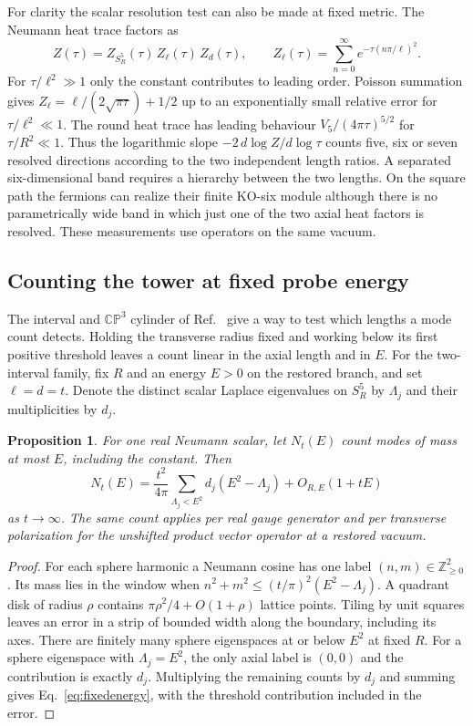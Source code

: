 \documentclass[aps,prd,reprint,onecolumn,nofootinbib,amsmath,amssymb]{revtex4-2}
\newtheorem{proposition}{Proposition}
\begin{document}
For clarity the scalar resolution test can also be made at fixed metric. The Neumann heat trace factors as
\begin{equation}
 Z(\tau)=Z_{S^5_R}(\tau)\,Z_\ell(\tau)\,Z_d(\tau),\qquad
 Z_\ell(\tau)=\sum_{n=0}^\infty e^{-\tau(n\pi/\ell)^2}.
\end{equation}
For $\tau/\ell^2\gg1$ only the constant contributes to leading order. Poisson summation gives $Z_\ell=\ell/(2\sqrt{\pi\tau})+1/2$ up to an exponentially small relative error for $\tau/\ell^2\ll1$. The round heat trace has leading behaviour $V_5/(4\pi\tau)^{5/2}$ for $\tau/R^2\ll1$. Thus the logarithmic slope $-2\,d\log Z/d\log\tau$ counts five, six or seven resolved directions according to the two independent length ratios. A separated six-dimensional band requires a hierarchy between the two lengths. On the square path the fermions can realize their finite KO-six module although there is no parametrically wide band in which just one of the two axial heat factors is resolved. These measurements use operators on the same vacuum.

\subsection{Counting the tower at fixed probe energy}
The interval and $\mathbb{CP}^3$ cylinder of Ref.~\cite{jointnote} give a way to test which lengths a mode count detects. Holding the transverse radius fixed and working below its first positive threshold leaves a count linear in the axial length and in $E$. For the two-interval family, fix $R$ and an energy $E>0$ on the restored branch, and set $\ell=d=t$. Denote the distinct scalar Laplace eigenvalues on $S^5_R$ by $\Lambda_j$ and their multiplicities by $d_j$.

\begin{proposition}\label{prop:fixedenergy}
For one real Neumann scalar, let $N_t(E)$ count modes of mass at most $E$, including the constant. Then
\begin{equation}
 N_t(E)=\frac{t^2}{4\pi}
   \sum_{\Lambda_j<E^2}d_j(E^2-\Lambda_j)
   +O_{R,E}(1+tE)
 \label{eq:fixedenergy}
\end{equation}
as $t\to\infty$. The same count applies per real gauge generator and per transverse polarization for the unshifted product vector operator at a restored vacuum.
\end{proposition}

\begin{proof}
For each sphere harmonic a Neumann cosine has one label $(n,m)\in\mathbb Z_{\ge0}^2$. Its mass lies in the window when $n^2+m^2\le(t/\pi)^2(E^2-\Lambda_j)$. A quadrant disk of radius $\rho$ contains $\pi\rho^2/4+O(1+\rho)$ lattice points. Tiling by unit squares leaves an error in a strip of bounded width along the boundary, including its axes. There are finitely many sphere eigenspaces at or below $E^2$ at fixed $R$. For a sphere eigenspace with $\Lambda_j=E^2$, the only axial label is $(0,0)$ and the contribution is exactly $d_j$. Multiplying the remaining counts by $d_j$ and summing gives Eq.~\eqref{eq:fixedenergy}, with the threshold contribution included in the error.
\end{proof}
\end{document}
